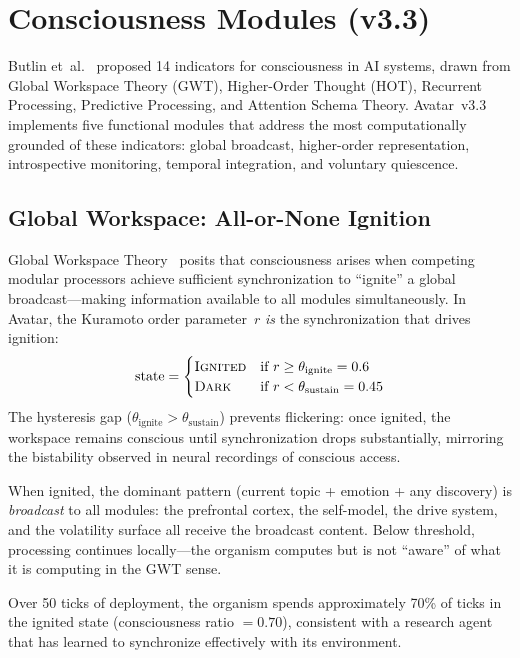 \documentclass[11pt,a4paper,twocolumn]{article}
\begin{document}
\section{Consciousness Modules (v3.3)}
\label{sec:consciousness}

Butlin et~al.~\cite{butlin2023} proposed 14 indicators for consciousness in AI systems, drawn from Global Workspace Theory (GWT), Higher-Order Thought (HOT), Recurrent Processing, Predictive Processing, and Attention Schema Theory.
Avatar~v3.3 implements five functional modules that address the most computationally grounded of these indicators: global broadcast, higher-order representation, introspective monitoring, temporal integration, and voluntary quiescence.

\subsection{Global Workspace: All-or-None Ignition}

Global Workspace Theory~\cite{baars1988,dehaene2014} posits that consciousness arises when competing modular processors achieve sufficient synchronization to ``ignite'' a global broadcast---making information available to all modules simultaneously.
In Avatar, the Kuramoto order parameter~$r$ \emph{is} the synchronization that drives ignition:
\begin{equation}
\text{state} = \begin{cases}
\textsc{Ignited} & \text{if } r \geq \theta_{\mathrm{ignite}} = 0.6 \\
\textsc{Dark} & \text{if } r < \theta_{\mathrm{sustain}} = 0.45
\end{cases}
\label{eq:gwt_ignition}
\end{equation}
The hysteresis gap ($\theta_{\mathrm{ignite}} > \theta_{\mathrm{sustain}}$) prevents flickering: once ignited, the workspace remains conscious until synchronization drops substantially, mirroring the bistability observed in neural recordings of conscious access.

When ignited, the dominant pattern (current topic + emotion + any discovery) is \emph{broadcast} to all modules: the prefrontal cortex, the self-model, the drive system, and the volatility surface all receive the broadcast content.
Below threshold, processing continues locally---the organism computes but is not ``aware'' of what it is computing in the GWT sense.

Over 50 ticks of deployment, the organism spends approximately 70\% of ticks in the ignited state (consciousness ratio $= 0.70$), consistent with a research agent that has learned to synchronize effectively with its environment.
\end{document}
